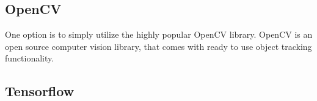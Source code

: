 \subsection{OpenCV}
One option is to simply utilize the highly popular OpenCV library.
OpenCV is an open source computer vision library, that comes with ready to use object tracking functionality.



\subsection{Tensorflow}






